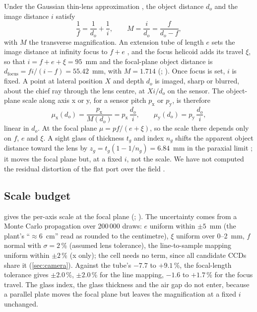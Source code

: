 Under the Gaussian thin-lens approximation \citep[\S\,5.2]{Hecht2017}, the object distance $d_o$ and the image
distance $i$ satisfy
\begin{equation}\label{eq:thinlens}
\frac{1}{f} = \frac{1}{d_o} + \frac{1}{i}, \qquad M = \frac{i}{d_o} = \frac{f}{d_o - f},
\end{equation}
with $M$ the transverse magnification. An extension tube of length $e$ sets the image distance at infinity focus to
$f + e$ \citep{PhotonsToPhotos2024}, and the focus helicoid adds its travel $\xi$, so that $i = f + e + \xi = 95$~mm
and the focal-plane object distance is $d_\mathrm{focus} = f i / (i - f) = 55.42$~mm, with $M = 1.714$
(; ). Once focus is set, $i$ is fixed. A point at lateral
position $X$ and depth $d_o$ is imaged, sharp or blurred, about the chief ray through the lens centre, at $X i / d_o$
on the sensor. The object-plane scale along axis x or y, for a sensor pitch $p_\mathrm{x}$ or $p_\mathrm{y}$, is therefore
\begin{equation}\label{eq:pixelsize}
\mu_\mathrm{x}(d_o) = \frac{p_\mathrm{x}}{M(d_o)} = p_\mathrm{x} \, \frac{d_o}{i}, \qquad \mu_\mathrm{y}(d_o) = p_\mathrm{y} \, \frac{d_o}{i},
\end{equation}
linear in $d_o$. At the focal plane $\mu = p f / (e + \xi)$, so the scale there depends only on $f$, $e$ and $\xi$.
A sight glass of thickness $t_g$ and index $n_g$ shifts the apparent object distance toward the lens by
$z_g = t_g (1 - 1/n_g) = 6.84$~mm in the paraxial limit \citep{Hecht2017}; it moves the focal plane but, at a fixed $i$,
not the scale. We have not computed the residual distortion of the flat port over the field \citep{Agrawal2012}.

\subsection{Scale budget}\label{sec:budget-detail}

 gives the per-axis scale at the focal plane (;
). The uncertainty comes from a Monte Carlo propagation over 200\,000 draws: $e$
uniform within $\pm 5$~mm (the plant's ``$\approx 6$~cm'' read as rounded to the centimetre), $\xi$ uniform over
0--2~mm, $f$ normal with $\sigma = 2$\,\% (assumed lens tolerance), the line-to-sample mapping uniform within
$\pm 2$\,\% (x only); the cell needs no term, since all candidate CCDs share it (\ref{sec:camera}). Against the tube's $-7.7$ to
$+9.1$\,\%, the focal-length tolerance gives $\pm 2.0$\,\%, $\pm 2.0$\,\%
for the line mapping, $-1.6$ to $+1.7$\,\% for the focus travel. The glass
index, the glass thickness and the air gap do not enter, because a parallel plate moves the focal plane but leaves the
magnification at a fixed $i$ unchanged.

